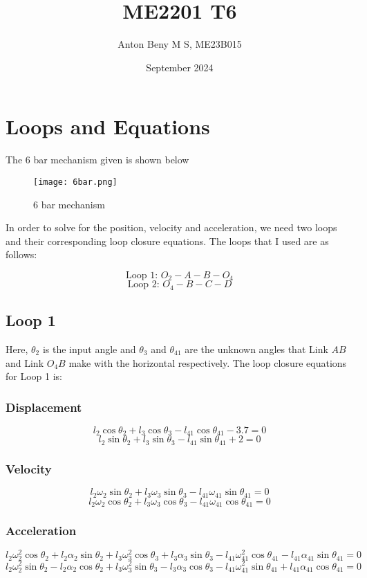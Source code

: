 \documentclass[12pt]{article}
\title{ME2201 T6}
\author{Anton Beny M S, ME23B015}
\date{September 2024}
\begin{document}
\maketitle

\section{Loops and Equations}

The 6 bar mechanism given is shown below

\begin{figure}[H]
    \centering
    \texttt{[image: 6bar.png]}
    \caption{6 bar mechanism}
    \label{fig:6bar}
\end{figure}

In order to solve for the position, velocity and acceleration, we need two loops and their corresponding loop closure equations. The loops that I used are as follows:

$$\text{Loop 1: } O_2 - A - B - O_4$$
$$\text{Loop 2: } O_4 - B - C - D$$

\subsection{Loop 1}

Here, $\theta_2$ is the input angle and $\theta_3$ and $\theta_{41}$ are the unknown angles that Link $AB$ and Link $O_4B$ make with the horizontal respectively. The loop closure equations for Loop 1 is:

\subsubsection{Displacement}
$$l_2 \cos{\theta_2} + l_3 \cos{\theta_3} - l_{41} \cos{\theta_{41}} - 3.7 = 0$$
$$l_2 \sin{\theta_2} + l_3 \sin{\theta_3} - l_{41} \sin{\theta_{41}} + 2 = 0$$

\subsubsection{Velocity}
$$l_2 \omega_2 \sin{\theta_2} + l_3 \omega_3 \sin{\theta_3} - l_{41} \omega_{41} \sin{\theta_{41}} = 0$$
$$l_2 \omega_2 \cos{\theta_2} + l_3 \omega_3 \cos{\theta_3} - l_{41} \omega_{41} \cos{\theta_{41}} = 0$$

\subsubsection{Acceleration}
$$l_2 \omega_2^2 \cos{\theta_2} + l_2 \alpha_2 \sin{\theta_2} + l_3 \omega_3^2 \cos{\theta_3} + l_3 \alpha_3 \sin{\theta_3} - l_{41} \omega_{41}^2 \cos{\theta_{41}} - l_{41} \alpha_{41} \sin{\theta_{41}} = 0$$
$$l_2 \omega_2^2 \sin{\theta_2} - l_2 \alpha_2 \cos{\theta_2} + l_3 \omega_3^2 \sin{\theta_3} - l_3 \alpha_3 \cos{\theta_3} - l_{41} \omega_{41}^2 \sin{\theta_{41}} + l_{41} \alpha_{41} \cos{\theta_{41}} = 0$$
\end{document}
